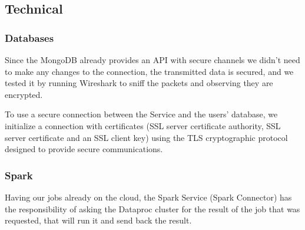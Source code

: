 \documentclass[oneside]{article}
\newcommand*\fpar{\hspace{1ex}}
\begin{document}
  \subsection{Technical}

    \subsubsection{Databases}
    \fpar Since the MongoDB already provides an API with secure channels we didn't need to make any changes to the connection, the transmitted data is secured, and we tested it by running Wireshark to sniff the packets and observing they are encrypted.
    \par To use a secure connection between the Service and the users' database, we initialize a connection with certificates (SSL server certificate authority, SSL server certificate and an SSL client key) using the TLS cryptographic protocol designed to provide secure communications.

    \subsubsection{Spark}
    \fpar Having our jobs already on the cloud, the Spark Service (Spark Connector) has the responsibility of asking the Dataproc cluster for the result of the job that was requested, that will run it and send back the result.
\end{document}
